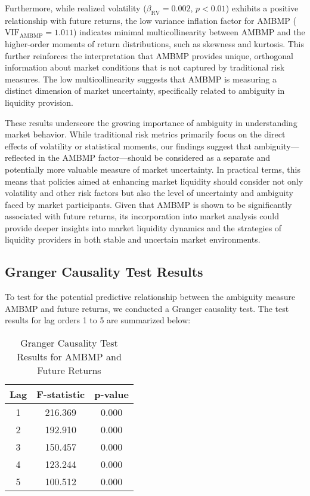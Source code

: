 \documentclass[preprint,12pt,authoryear]{elsarticle}
\begin{document}
Furthermore, while realized volatility (\(\beta_{\mathrm{RV}} = 0.002\), \(p < 0.01\)) exhibits a positive relationship with future returns, the low variance inflation factor for AMBMP (\(\mathrm{VIF}_{\mathrm{AMBMP}} = 1.011\)) indicates minimal multicollinearity between AMBMP and the higher-order moments of return distributions, such as skewness and kurtosis. This further reinforces the interpretation that AMBMP provides unique, orthogonal information about market conditions that is not captured by traditional risk measures. The low multicollinearity suggests that AMBMP is measuring a distinct dimension of market uncertainty, specifically related to ambiguity in liquidity provision.

These results underscore the growing importance of ambiguity in understanding market behavior. While traditional risk metrics primarily focus on the direct effects of volatility or statistical moments, our findings suggest that ambiguity—reflected in the AMBMP factor—should be considered as a separate and potentially more valuable measure of market uncertainty. In practical terms, this means that policies aimed at enhancing market liquidity should consider not only volatility and other risk factors but also the level of uncertainty and ambiguity faced by market participants. Given that AMBMP is shown to be significantly associated with future returns, its incorporation into market analysis could provide deeper insights into market liquidity dynamics and the strategies of liquidity providers in both stable and uncertain market environments.

\subsection{Granger Causality Test Results}

To test for the potential predictive relationship between the ambiguity measure \( \text{AMBMP} \) and future returns, we conducted a Granger causality test. The test results for lag orders 1 to 5 are summarized below:

\begin{table}[h!]
\centering
\begin{tabular}{ccc}
\toprule
Lag & F-statistic & p-value \\ 
\midrule
1 & 216.369 & 0.000 \\
2 & 192.910 & 0.000 \\
3 & 150.457 & 0.000 \\
4 & 123.244 & 0.000 \\
5 & 100.512 & 0.000 \\
\bottomrule
\end{tabular}
\caption{Granger Causality Test Results for AMBMP and Future Returns}
\end{table}
\end{document}
